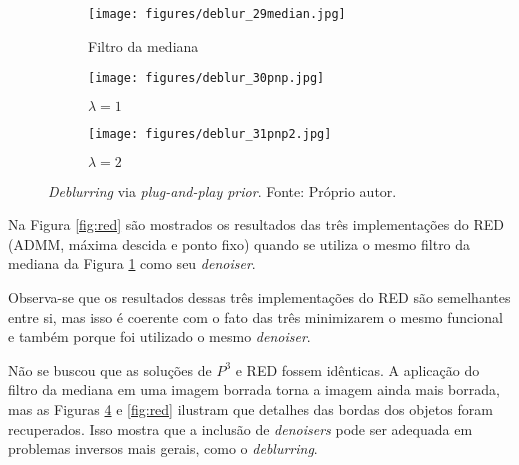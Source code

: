 \begin{figure}[H]
     \centering
     \begin{subfigure}[b]{0.32\textwidth}
         \centering
         \texttt{[image: figures/deblur\_29median.jpg]}
         \caption{Filtro da mediana}
         \label{fig:medianpnpa}
     \end{subfigure}
     \hfill
     \begin{subfigure}[b]{0.32\textwidth}
         \centering
                  \texttt{[image: figures/deblur\_30pnp.jpg]}
         \caption{$\lambda = 1$}
         \label{fig:medianpnpb}
     \end{subfigure}
          \hfill
     \begin{subfigure}[b]{0.32\textwidth}
         \centering
                  \texttt{[image: figures/deblur\_31pnp2.jpg]}
         \caption{$\lambda = 2$}
         \label{fig:medianpnpc}
     \end{subfigure}
\caption[\textit{Deblurring} via \textit{plug-and-play prior}.]{\textit{Deblurring} via \textit{plug-and-play prior}. Fonte: Próprio autor.}
\label{fig:medianpnp}
\end{figure}

Na Figura \ref{fig:red} são mostrados os resultados das três implementações do RED (ADMM, máxima descida e ponto fixo) quando se utiliza o mesmo filtro da mediana da Figura \ref{fig:medianpnpa} como seu \textit{denoiser}. 

Observa-se que os resultados dessas três implementações do RED são semelhantes entre si, mas isso é coerente com o fato das três minimizarem o mesmo funcional e também porque foi utilizado o mesmo \textit{denoiser}. 

Não se buscou que as soluções de $P^3$ e RED fossem idênticas. A aplicação do filtro da mediana em uma imagem borrada torna a imagem ainda mais borrada, mas as Figuras \ref{fig:medianpnp} e \ref{fig:red} ilustram que detalhes das bordas dos objetos foram recuperados. Isso mostra que a inclusão de \textit{denoisers} pode ser adequada em  problemas inversos mais gerais, como o \textit{deblurring}. 

